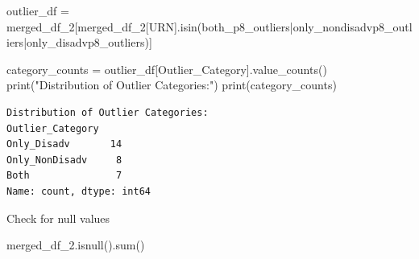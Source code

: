 \documentclass[
  letterpaper,
  DIV=11,
  numbers=noendperiod]{scrartcl}
\newenvironment{Shaded}{\begin{snugshade}}{\end{snugshade}}
\newcommand{\BuiltInTok}[1]{\textcolor[rgb]{0.00,0.23,0.31}{#1}}
\newcommand{\NormalTok}[1]{\textcolor[rgb]{0.00,0.23,0.31}{#1}}
\newcommand{\OperatorTok}[1]{\textcolor[rgb]{0.37,0.37,0.37}{#1}}
\newcommand{\StringTok}[1]{\textcolor[rgb]{0.13,0.47,0.30}{#1}}
\begin{document}
\begin{Shaded}
\begin{Highlighting}[]
\NormalTok{outlier\_df }\OperatorTok{=}\NormalTok{ merged\_df\_2[merged\_df\_2[}\StringTok{\textquotesingle{}URN\textquotesingle{}}\NormalTok{].isin(both\_p8\_outliers}\OperatorTok{|}\NormalTok{only\_nondisadvp8\_outliers}\OperatorTok{|}\NormalTok{only\_disadvp8\_outliers)]}


\NormalTok{category\_counts }\OperatorTok{=}\NormalTok{ outlier\_df[}\StringTok{\textquotesingle{}Outlier\_Category\textquotesingle{}}\NormalTok{].value\_counts()}
\BuiltInTok{print}\NormalTok{(}\StringTok{"Distribution of Outlier Categories:"}\NormalTok{)}
\BuiltInTok{print}\NormalTok{(category\_counts)}
\end{Highlighting}
\end{Shaded}

\begin{verbatim}
Distribution of Outlier Categories:
Outlier_Category
Only_Disadv       14
Only_NonDisadv     8
Both               7
Name: count, dtype: int64
\end{verbatim}

Check for null values

\begin{Shaded}
\begin{Highlighting}[]
\NormalTok{merged\_df\_2.isnull().}\BuiltInTok{sum}\NormalTok{()}
\end{Highlighting}
\end{Shaded}
\end{document}
